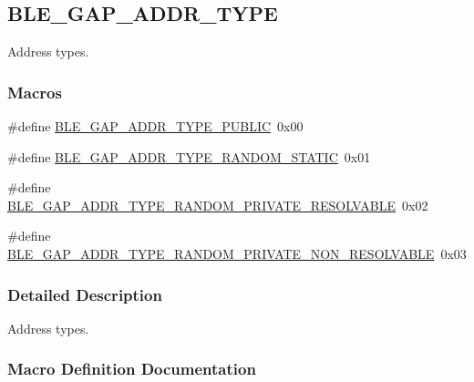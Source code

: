 \hypertarget{group___b_l_e___g_a_p___a_d_d_r___t_y_p_e}{}\subsection{B\+L\+E\+\_\+\+G\+A\+P\+\_\+\+A\+D\+D\+R\+\_\+\+T\+Y\+PE}
\label{group___b_l_e___g_a_p___a_d_d_r___t_y_p_e}


Address types.  


\subsubsection*{Macros}
\begin{DoxyCompactItemize}
\item 
\#define \hyperlink{group___b_l_e___g_a_p___a_d_d_r___t_y_p_e_gaa5e499423d88b16817efd4d5ec10fd6e}{B\+L\+E\+\_\+\+G\+A\+P\+\_\+\+A\+D\+D\+R\+\_\+\+T\+Y\+P\+E\+\_\+\+P\+U\+B\+L\+IC}~0x00
\item 
\#define \hyperlink{group___b_l_e___g_a_p___a_d_d_r___t_y_p_e_gabe27b8f22c3a52413fa064c2ee1e4fba}{B\+L\+E\+\_\+\+G\+A\+P\+\_\+\+A\+D\+D\+R\+\_\+\+T\+Y\+P\+E\+\_\+\+R\+A\+N\+D\+O\+M\+\_\+\+S\+T\+A\+T\+IC}~0x01
\item 
\#define \hyperlink{group___b_l_e___g_a_p___a_d_d_r___t_y_p_e_gae166d654401b0ed83ad7073f31467b70}{B\+L\+E\+\_\+\+G\+A\+P\+\_\+\+A\+D\+D\+R\+\_\+\+T\+Y\+P\+E\+\_\+\+R\+A\+N\+D\+O\+M\+\_\+\+P\+R\+I\+V\+A\+T\+E\+\_\+\+R\+E\+S\+O\+L\+V\+A\+B\+LE}~0x02
\item 
\#define \hyperlink{group___b_l_e___g_a_p___a_d_d_r___t_y_p_e_ga86fe5e506ba152ec4d60ac6daaca2aef}{B\+L\+E\+\_\+\+G\+A\+P\+\_\+\+A\+D\+D\+R\+\_\+\+T\+Y\+P\+E\+\_\+\+R\+A\+N\+D\+O\+M\+\_\+\+P\+R\+I\+V\+A\+T\+E\+\_\+\+N\+O\+N\+\_\+\+R\+E\+S\+O\+L\+V\+A\+B\+LE}~0x03
\end{DoxyCompactItemize}


\subsubsection{Detailed Description}
Address types. 



\subsubsection{Macro Definition Documentation}
